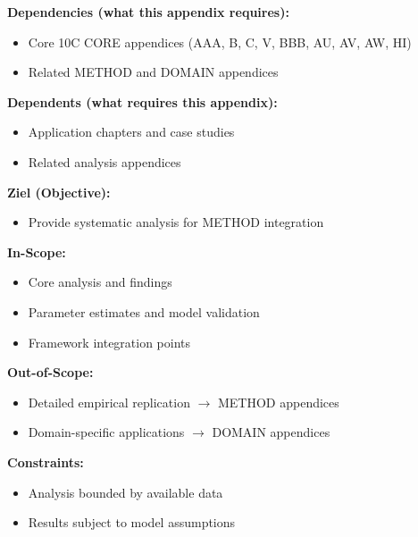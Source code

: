 \begin{tcolorbox}[colback=blue!5!white, colframe=blue!75!black,
    title=Cross-Reference Map]

\textbf{Dependencies (what this appendix requires):}
\begin{itemize}[nosep]
    \item Core 10C CORE appendices (AAA, B, C, V, BBB, AU, AV, AW, HI)
    \item Related METHOD and DOMAIN appendices
\end{itemize}

\textbf{Dependents (what requires this appendix):}
\begin{itemize}[nosep]
    \item Application chapters and case studies
    \item Related analysis appendices
\end{itemize}

\end{tcolorbox}


\begin{tcolorbox}[
    colback=orange!5!white,
    colframe=orange!75!black,
    title={\textbf{Appendix Scope: Ziel / In-Scope / Out-of-Scope / Constraints}},
    fonttitle=\bfseries
]

\textbf{Ziel (Objective):}
\begin{itemize}[nosep]
    \item Provide systematic analysis for METHOD integration
\end{itemize}

\textbf{In-Scope:}
\begin{itemize}[nosep]
    \item Core analysis and findings
    \item Parameter estimates and model validation
    \item Framework integration points
\end{itemize}

\textbf{Out-of-Scope:}
\begin{itemize}[nosep]
    \item Detailed empirical replication $\rightarrow$ METHOD appendices
    \item Domain-specific applications $\rightarrow$ DOMAIN appendices
\end{itemize}

\textbf{Constraints:}
\begin{itemize}[nosep]
    \item Analysis bounded by available data
    \item Results subject to model assumptions
\end{itemize}

\end{tcolorbox}

